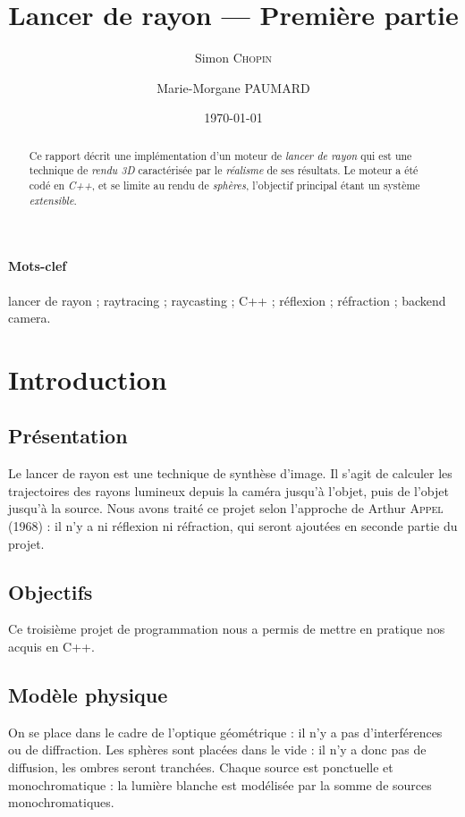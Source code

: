 \documentclass{article}
\title{Lancer de rayon — Première partie}
\author{Simon \textsc{Chopin} \and Marie-Morgane \textsc{PAUMARD}}
\date{\today}
\begin{document}
\maketitle
\tableofcontents
\begin{abstract}
    Ce rapport décrit une implémentation d'un moteur de \emph{lancer de rayon} 
    qui est une technique de \emph{rendu 3D} caractérisée par le \emph{réalisme}
    de ses résultats. Le moteur a été codé en \emph{C++}, et se limite au rendu
    de \emph{sphères}, l'objectif principal étant un système \emph{extensible}.
    
\end{abstract}

\paragraph{Mots-clef}
lancer de rayon ; raytracing ; raycasting ; C++ ; réflexion ; réfraction ; backend camera.

\section{Introduction}
\subsection{Présentation}
Le lancer de rayon est une technique de synthèse d’image. Il s’agit de calculer
les trajectoires des rayons lumineux depuis la caméra jusqu’à l’objet, puis de
l’objet jusqu’à la source.
Nous avons traité ce projet selon l'approche de Arthur \textsc{Appel} (1968) :
il n'y a ni réflexion ni réfraction, qui seront ajoutées en seconde partie du
projet.

\subsection{Objectifs}
Ce troisième projet de programmation nous a permis de mettre en pratique nos
acquis en C++.

\subsection{Modèle physique}
On se place dans le cadre de l'optique géométrique : il n'y a pas
d'interférences ou de diffraction. Les sphères sont placées dans le vide : il
n'y a donc pas de diffusion, les ombres seront tranchées. Chaque source est
ponctuelle et monochromatique : la lumière blanche est modélisée par la somme
de sources monochromatiques.
\end{document}
